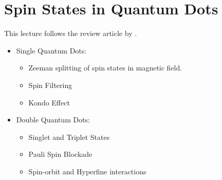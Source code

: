 
\section{Spin States in Quantum Dots}

This lecture follows the review article by \cite{Hanson2007}.

\begin{itemize}
    \item Single Quantum Dots:
          \begin{itemize}
              \item Zeeman splitting of spin states in magnetic field.
              \item Spin Filtering
              \item Kondo Effect
          \end{itemize}
    \item Double Quantum Dots:
          \begin{itemize}
              \item Singlet and Triplet States
              \item Pauli Spin Blockade
              \item Spin-orbit and Hyperfine interactions
          \end{itemize}



\end{itemize}
